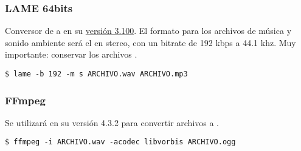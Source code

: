 \subsubsection{LAME 64bits}
Conversor de  a  en su \href{https://lame.sourceforge.io/download.php}{versión 3.100}. El formato para los archivos de música y sonido ambiente será el  en stereo, con un bitrate de 192 kbps a 44.1 khz. Muy importante: conservar los archivos .

\begin{lstlisting}
$ lame -b 192 -m s ARCHIVO.wav ARCHIVO.mp3
\end{lstlisting}

\subsubsection{FFmpeg}
Se utilizará en su versión 4.3.2 para convertir archivos  a .

\begin{lstlisting}
$ ffmpeg -i ARCHIVO.wav -acodec libvorbis ARCHIVO.ogg
\end{lstlisting}